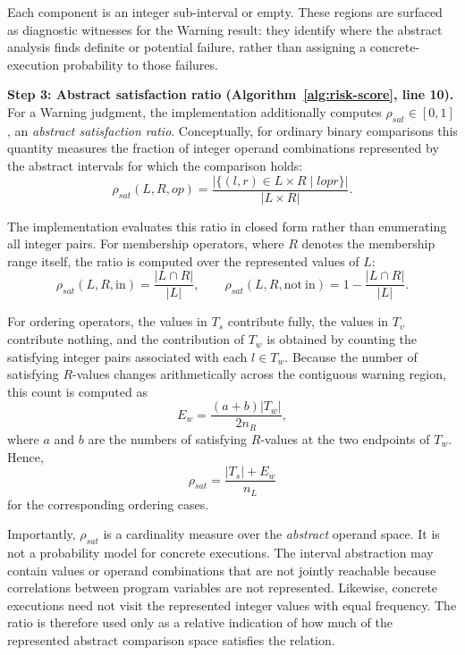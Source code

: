 \documentclass[pdflatex,sn-basic]{sn-jnl}%
\theoremstyle{thmstyleone}%
\theoremstyle{thmstyletwo}%
\theoremstyle{thmstylethree}%
\begin{document}
Each component is an integer sub-interval or empty.
These regions are surfaced as diagnostic witnesses for the Warning result:
they identify where the abstract analysis finds definite or potential failure,
rather than assigning a concrete-execution probability to those failures.



\smallskip
\noindent\textbf{Step 3: Abstract satisfaction ratio
(Algorithm~\ref{alg:risk-score}, line 10).}
For a Warning judgment, the implementation additionally computes
$\rho_{\mathit{sat}}\in[0,1]$, an \emph{abstract satisfaction ratio}.
Conceptually, for ordinary binary comparisons this quantity measures the
fraction of integer operand combinations represented by the abstract intervals
for which the comparison holds:
\[
\rho_{\mathit{sat}}(L,R,op)
=
\frac{
\left|
\{(l,r)\in L\times R \mid l\mathrel{op}r\}
\right|
}{
|L\times R|
}.
\]

The implementation evaluates this ratio in closed form rather than enumerating
all integer pairs.
For membership operators, where $R$ denotes the membership range itself,
the ratio is computed over the represented values of $L$:
\[
\rho_{\mathit{sat}}(L,R,\mathrm{in})
=
\frac{|L\cap R|}{|L|},
\qquad
\rho_{\mathit{sat}}(L,R,\mathrm{not\ in})
=
1-\frac{|L\cap R|}{|L|}.
\]

For ordering operators, the values in $T_s$ contribute fully,
the values in $T_v$ contribute nothing, and the contribution of $T_w$
is obtained by counting the satisfying integer pairs associated with each
$l\in T_w$.
Because the number of satisfying $R$-values changes arithmetically across
the contiguous warning region, this count is computed as
\[
E_w
=
\frac{(a+b)|T_w|}{2n_R},
\]
where $a$ and $b$ are the numbers of satisfying $R$-values at the two
endpoints of $T_w$.
Hence,
\[
\rho_{\mathit{sat}}
=
\frac{|T_s|+E_w}{n_L}
\]
for the corresponding ordering cases.

Importantly, $\rho_{\mathit{sat}}$ is a cardinality measure over the
\emph{abstract} operand space.
It is not a probability model for concrete executions.
The interval abstraction may contain values or operand combinations that are
not jointly reachable because correlations between program variables are not
represented.
Likewise, concrete executions need not visit the represented integer values
with equal frequency.
The ratio is therefore used only as a relative indication of how much of the
represented abstract comparison space satisfies the relation.
\end{document}

